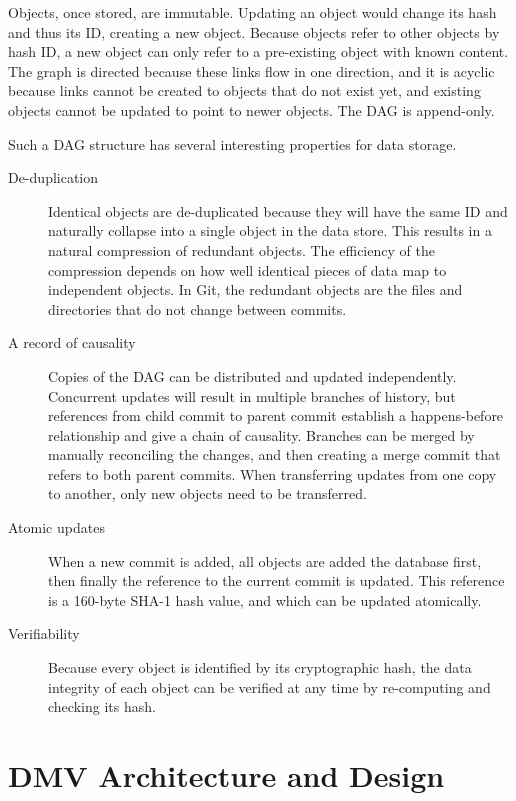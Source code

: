 \documentclass[usenglish]{nik}
\begin{document}
Objects, once stored, are immutable.
Updating an object would change its hash and thus its ID, creating a new object.
Because objects refer to other objects by hash ID, a new object can only refer to a pre-existing object with known content.
The graph is directed because these links flow in one direction, and it is acyclic because links cannot be created to objects that do not exist yet, and existing objects cannot be updated to point to newer objects.
The DAG is append-only.

Such a DAG structure has several interesting properties for data storage.
\begin{description}
    \item[De-duplication]
        Identical objects are de-duplicated because they will have the same ID and naturally collapse into a single object in the data store.
        This results in a natural compression of redundant objects.
        The efficiency of the compression depends on how well identical pieces of data map to independent objects.
        In Git, the redundant objects are the files and directories that do not change between commits.
    \item[A record of causality]
        Copies of the DAG can be distributed and updated independently.
        Concurrent updates will result in multiple branches of history, but references from child commit to parent commit establish a happens-before relationship and give a chain of causality.
        Branches can be merged by manually reconciling the changes, and then creating a merge commit that refers to both parent commits.
        When transferring updates from one copy to another, only new objects need to be transferred.
    \item[Atomic updates]
        When a new commit is added, all objects are added the database first, then finally the reference to the current commit is updated.
        This reference is a 160-byte SHA-1 hash value, and which can be updated atomically.
    \item[Verifiability]
        Because every object is identified by its cryptographic hash, the data integrity of each object can be verified at any time by re-computing and checking its hash.
\end{description}



\section{DMV Architecture and Design}
\end{document}
